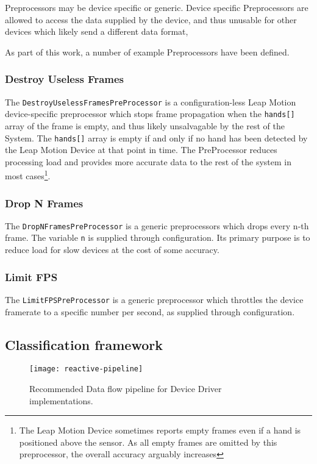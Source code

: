 Preprocessors may be device specific or generic. Device specific Preprocessors are allowed to access the data supplied by the device, and thus unusable for other devices which likely send a different data format,

As part of this work, a number of example Preprocessors have been defined.

\subsubsection{Destroy Useless Frames}
The \texttt{DestroyUselessFramesPreProcessor} is a configuration-less Leap Motion device-specific preprocessor which stops frame propagation when the \texttt{hands[]} array of the frame is empty, and thus likely unsalvagable by the rest of the System. The \texttt{hands[]} array is empty if and only if no hand has been detected by the Leap Motion Device at that point in time. The PreProcessor reduces processing load and provides more accurate data to the rest of the system in most cases\footnote{The Leap Motion Device sometimes reports empty frames even if a hand is positioned above the sensor. As all empty frames are omitted by this preprocessor, the overall accuracy arguably increases}.

\subsubsection{Drop N Frames}
The \texttt{DropNFramesPreProcessor} is a generic preprocessors which drops every n-th frame. The variable \texttt{n} is supplied through configuration. Its primary purpose is to reduce load for slow devices at the cost of some accuracy.

\subsubsection{Limit FPS}
The \texttt{LimitFPSPreProcessor} is a generic preprocessor which throttles the device framerate to a specific number per second, as supplied through configuration.

\subsection{Classification framework}
\label{sec:impl:classify}
\begin{figure}[h]
    \centering
    \texttt{[image: reactive-pipeline]}
    \caption{Recommended Data flow pipeline for Device Driver implementations.}
    \label{fig:reactive-pipeline}
\end{figure}

